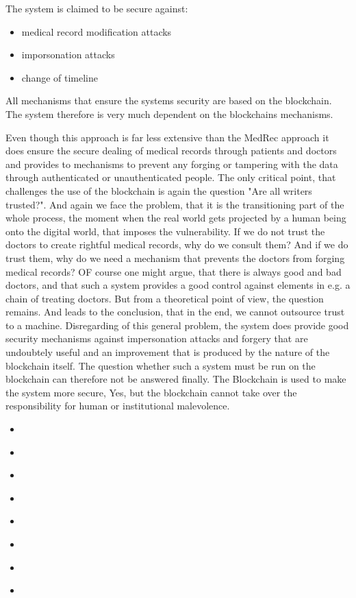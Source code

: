 The system is claimed to be secure against:
\begin{itemize}
	\item medical record modification attacks
	\item imporsonation attacks
	\item change of timeline
\end{itemize}
All mechanisms that ensure the systems security are based on the blockchain. The system therefore is very much dependent on the blockchains mechanisms.

Even though this approach is far less extensive than the MedRec approach it does ensure the secure dealing of medical records through patients and doctors and provides to mechanisms to prevent any forging or tampering with the data through authenticated or unauthenticated people.
The only critical point, that challenges the use of the blockchain is again the question "Are all writers trusted?"\cite{Wust2017}. And again we face the problem, that it is the transitioning part of the whole process, the moment when the real world gets projected by a human being onto the digital world, that imposes the vulnerability.
If we do not trust the doctors to create rightful medical records, why do we consult them? And if we do trust them, why do we need a mechanism that prevents the doctors from forging medical records?
OF course one might argue, that there is always good and bad doctors, and that such a system provides a good control against elements in e.g. a chain of treating doctors. But from a theoretical point of view, the question remains. And leads to the conclusion, that in the end, we cannot outsource trust to a machine. 
Disregarding of this general problem, the system does provide good security mechanisms against impersonation attacks and forgery that are undoubtely useful and an improvement that is produced by the nature of the blockchain itself.
The question whether such a system must be run on the blockchain can therefore not be answered finally. The Blockchain is used to make the system more secure, Yes, but the blockchain cannot take over the responsibility for human or institutional malevolence.


\begin{itemize}
	\item \cite{Zyskind2015}
	\item \cite{Yue2016}
	\item \cite{Azaria2016}
	\item \cite{Fotiou2016}
	\item \cite{Zhang2017}
	\item \cite{Zhang2018}
	\item \cite{Esposito2018}
	\item \cite{Ekblaw2016}
\end{itemize}

